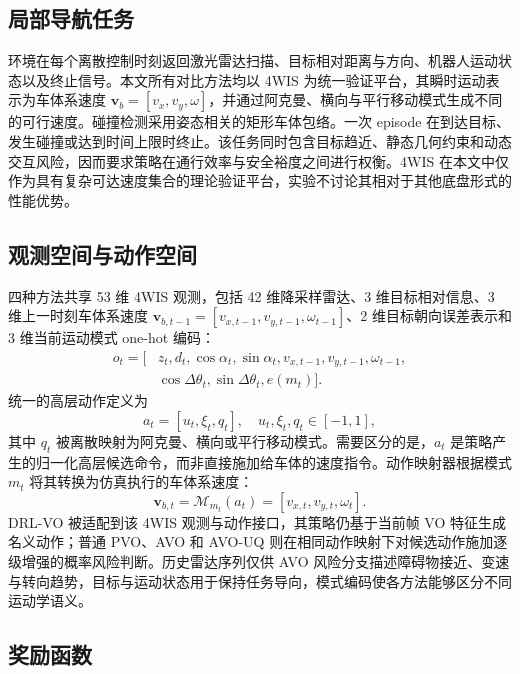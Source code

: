 \documentclass[UTF8,10pt,a4paper,twocolumn]{ctexart}
\begin{document}
\subsection{局部导航任务}

环境在每个离散控制时刻返回激光雷达扫描、目标相对距离与方向、机器人运动状态以及终止信号。本文所有对比方法均以 4WIS 为统一验证平台，其瞬时运动表示为车体系速度 $\mathbf v_b=[v_x,v_y,\omega]$，并通过阿克曼、横向与平行移动模式生成不同的可行速度。碰撞检测采用姿态相关的矩形车体包络。一次 episode 在到达目标、发生碰撞或达到时间上限时终止。该任务同时包含目标趋近、静态几何约束和动态交互风险，因而要求策略在通行效率与安全裕度之间进行权衡。4WIS 在本文中仅作为具有复杂可达速度集合的理论验证平台，实验不讨论其相对于其他底盘形式的性能优势。

\subsection{观测空间与动作空间}

四种方法共享 53 维 4WIS 观测，包括 42 维降采样雷达、3 维目标相对信息、3 维上一时刻车体系速度 $\mathbf v_{b,t-1}=[v_{x,t-1},v_{y,t-1},\omega_{t-1}]$、2 维目标朝向误差表示和 3 维当前运动模式 one-hot 编码：
\begin{equation}
\begin{aligned}
    o_t=[&z_t,d_t,\cos\alpha_t,\sin\alpha_t,v_{x,t-1},v_{y,t-1},\omega_{t-1},\\
    &\cos\Delta\theta_t,\sin\Delta\theta_t,e(m_t)].
\end{aligned}
\end{equation}
统一的高层动作定义为
\begin{equation}
    a_t=[u_t,\xi_t,q_t], \quad u_t,\xi_t,q_t\in[-1,1],
\end{equation}
其中 $q_t$ 被离散映射为阿克曼、横向或平行移动模式。需要区分的是，$a_t$ 是策略产生的归一化高层候选命令，而非直接施加给车体的速度指令。动作映射器根据模式 $m_t$ 将其转换为仿真执行的车体系速度：
\begin{equation}
    \mathbf v_{b,t}=\mathcal M_{m_t}(a_t)=[v_{x,t},v_{y,t},\omega_t].
    \label{eq:action_mapping}
\end{equation}
DRL-VO 被适配到该 4WIS 观测与动作接口，其策略仍基于当前帧 VO 特征生成名义动作；普通 PVO、AVO 和 AVO-UQ 则在相同动作映射下对候选动作施加逐级增强的概率风险判断。历史雷达序列仅供 AVO 风险分支描述障碍物接近、变速与转向趋势，目标与运动状态用于保持任务导向，模式编码使各方法能够区分不同运动学语义。

\subsection{奖励函数}
\end{document}
